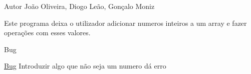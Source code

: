 \begin{DoxyAuthor}{Autor}
João Oliveira, Diogo Leão, Gonçalo Moniz
\end{DoxyAuthor}
Este programa deixa o utilizador adicionar numeros inteiros a um array e fazer operações com esses valores.

\begin{DoxyRefDesc}{Bug}
\item[\mbox{\hyperlink{bug__bug000003}{Bug}}]Introduzir algo que não seja um numero dá erro\end{DoxyRefDesc}
